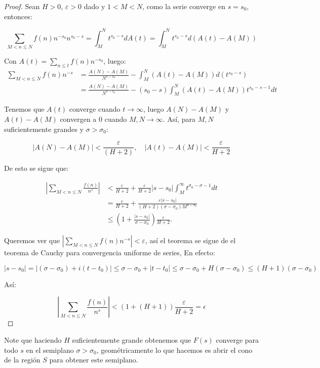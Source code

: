 \begin{proof}
Sean $H>0$, $\varepsilon>0$ dado y $1<M<N$, como la serie converge en $s=s_0$, entonces:

$$\sum_{M<n \leq N} f(n) n^{-s_0} n^{s_0-s}=\int_M^N t^{s_0-s} d A(t)=\int_M^N t^{s_0-s} d(A(t)-A(M))$$

Con $A(t)=\displaystyle\sum_{n \leq t} f(n) n^{-s_0}$, luego:
$$
\begin{aligned}
\sum_{M<n \leq N} f(n) n^{-s} & =\frac{A(N)-A(M)}{N^{s-s_0}}- \int_M^N(A(t)-A(M)) d(t^{s_0-s})\\
&=\frac{A(N)-A(M)}{N^{s-s_0}}-(s_0-s)\int_M^N(A(t)-A(M))t^{s_0-s-1}dt
\end{aligned}
$$

Tenemos que $A(t)$ converge cuando $t\to\infty$, luego $A(N)-A(M)$ y $A(t)-A(M)$ convergen a 0 cuando $M,N\to \infty$. Así, para $M, N$ suficientemente grandes y $\sigma>\sigma_0$:

$$|A(N)-A(M)|<\frac{\varepsilon}{(H+2)}, \quad|A(t)-A(M)|<\frac{\varepsilon}{H+2}$$

De esto se sigue que:

$$\begin{aligned}
\left|\sum_{M<n \leq N} \frac{f(n)}{n^s}\right|&<\frac{\varepsilon}{H+2}+\frac{\varepsilon}{H+2}\left|s-s_0\right| \int_M^{\infty} t^{\sigma_0-\sigma-1} d t\\
&=\frac{\varepsilon}{H+2}+\frac{\varepsilon\left|s-s_0\right|}{(H+2)\left(\sigma-\sigma_0\right) M^{\sigma-\sigma_0}}\\
&\leq\left(1+\frac{\left|s-s_0\right|}{\sigma-\sigma_0}\right) \frac{\varepsilon}{H+2} .
\end{aligned}$$

Queremos ver que $\left|\displaystyle\sum_{M<n \leq N} f(n) n^{-s}\right|<\varepsilon$, así el teorema se sigue de el teorema de Cauchy para convergencia uniforme de series, En efecto:

$$\left|s-s_0\right|=\left|\left(\sigma-\sigma_0\right)+i\left(t-t_0\right)\right| \leq \sigma-\sigma_0+\left|t-t_0\right| \leq\sigma-\sigma_0+H(\sigma-\sigma_0)\leq(H+1)\left(\sigma-\sigma_0\right)$$

Así:

$$\left|\sum_{M<n \leq N} \frac{f(n)}{n^s}\right|<(1+(H+1))\frac{\varepsilon}{H+2}=\epsilon$$
\end{proof}


Note que haciendo $H$ suficientemente grande obtenemos que $F(s)$ converge para todo  $s$ en el semiplano $\sigma>\sigma_0$, geométricamente lo que hacemos es abrir el cono de la región $S$ para obtener este semiplano.\cite{montgomery2007multiplicative}

